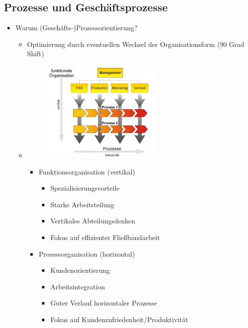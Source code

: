\documentclass[11pt,a4paper]{article}
\begin{document}
\subsection{Prozesse und Geschäftsprozesse}
\begin{itemize}

\item Warum (Geschäfts-)Prozessorientierung?
	\begin{itemize}
		\item Optimierung durch eventuellen Wechsel der Organisationsform (90 Grad Shift)	
		\item[] 
		\vspace{0.3cm}
			\begin{minipage}{0.3\textwidth}
				\begin{figure}[H]
				\includegraphics[height=5cm]{Bilder/vertical_horizontal}
				\end{figure}
			\end{minipage}
			\begin{minipage}[t]{0.6\textwidth}
				\vspace{-3cm}
				\begin{itemize}
				\item Funktionsorganisation (vertikal)
					\begin{itemize}
					\item Spezialisierungsvorteile
					\item Starke Arbeitsteilung
					\item Vertikales Abteilungsdenken
					\item Fokus auf effizienter Fließbandarbeit
					\end{itemize}					 
				
				\item Prozessorganisation (horizontal)
					\begin{itemize}
					\item Kundenorientierung 
					\item Arbeitsintegration
					\item Guter Verlauf horizontaler Prozesse
					\item Fokus auf Kundenzufriedenheit/Produktivität
					\end{itemize}
				\end{itemize}
			\end{minipage}
			

\end{itemize}
\end{itemize}
\end{document}
